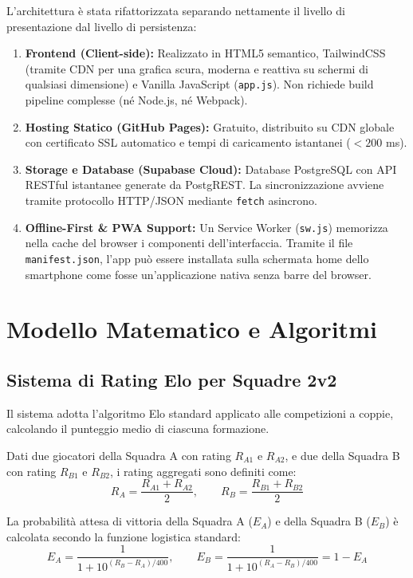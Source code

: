 \documentclass[11pt,a4paper]{article}
\begin{document}
L'architettura \`e stata rifattorizzata separando nettamente il livello di presentazione dal livello di persistenza:
\begin{enumerate}
    \item \textbf{Frontend (Client-side):} Realizzato in HTML5 semantico, TailwindCSS (tramite CDN per una grafica scura, moderna e reattiva su schermi di qualsiasi dimensione) e Vanilla JavaScript (\texttt{app.js}). Non richiede build pipeline complesse (n\'e Node.js, n\'e Webpack).
    \item \textbf{Hosting Statico (GitHub Pages):} Gratuito, distribuito su CDN globale con certificato SSL automatico e tempi di caricamento istantanei ($<200$ ms).
    \item \textbf{Storage e Database (Supabase Cloud):} Database PostgreSQL con API RESTful istantanee generate da PostgREST. La sincronizzazione avviene tramite protocollo HTTP/JSON mediante \texttt{fetch} asincrono.
    \item \textbf{Offline-First \& PWA Support:} Un Service Worker (\texttt{sw.js}) memorizza nella cache del browser i componenti dell'interfaccia. Tramite il file \texttt{manifest.json}, l'app pu\`o essere installata sulla schermata home dello smartphone come fosse un'applicazione nativa senza barre del browser.
\end{enumerate}

\section{Modello Matematico e Algoritmi}

\subsection{Sistema di Rating Elo per Squadre 2v2}
Il sistema adotta l'algoritmo Elo standard applicato alle competizioni a coppie, calcolando il punteggio medio di ciascuna formazione.

Dati due giocatori della Squadra A con rating $R_{A1}$ e $R_{A2}$, e due della Squadra B con rating $R_{B1}$ e $R_{B2}$, i rating aggregati sono definiti come:
\begin{equation}
R_A = \frac{R_{A1} + R_{A2}}{2}, \qquad R_B = \frac{R_{B1} + R_{B2}}{2}
\end{equation}

La probabilit\`a attesa di vittoria della Squadra A ($E_A$) e della Squadra B ($E_B$) \`e calcolata secondo la funzione logistica standard:
\begin{equation}
E_A = \frac{1}{1 + 10^{(R_B - R_A)/400}}, \qquad E_B = \frac{1}{1 + 10^{(R_A - R_B)/400}} = 1 - E_A
\end{equation}
\end{document}
